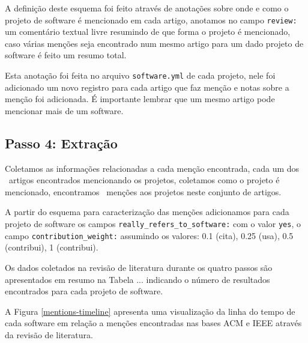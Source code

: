 A definição deste esquema foi feito através de anotações sobre onde
e como o projeto de software é mencionado em cada artigo, anotamos no campo
\texttt{review:} um comentário textual livre resumindo de que forma o projeto
é mencionado, caso várias menções seja encontrado num mesmo artigo para um dado
projeto de software é feito um resumo total.

Esta anotação foi feita no arquivo \texttt{software.yml} de cada projeto, nele
foi adicionado um novo registro para cada artigo que faz menção e notas sobre a
menção foi adicionada. É importante lembrar que um mesmo artigo pode mencionar
mais de um software.


\subsection{Passo 4: Extração}

Coletamos as informações relacionadas a cada menção encontrada, cada um dos
\ScreeningUniqueCount \ artigos encontrados mencionando os projetos, coletamos
como o projeto é mencionado, encontramos \ScreeningCount \ menções aos
projetos neste conjunto de artigos.

A partir do esquema para caracterização das menções adicionamos para
cada projeto de software os campos \texttt{really\_refers\_to\_software:}
com o valor \texttt{yes}, o campo \texttt{contribution\_weight:} assumindo
os valores: 0.1 (cita), 0.25 (usa), 0.5 (contribui), 1 (contribui).

Os dados coletados na revisão de literatura durante os quatro passos são
apresentados em resumo na Tabela ... indicando o
número de resultados encontrados para cada projeto de software.

%

A Figura \ref{mentions-timeline} apresenta uma visualização da linha do tempo
de cada software em relação a menções encontradas nas bases ACM e IEEE através
da revisão de literatura.

